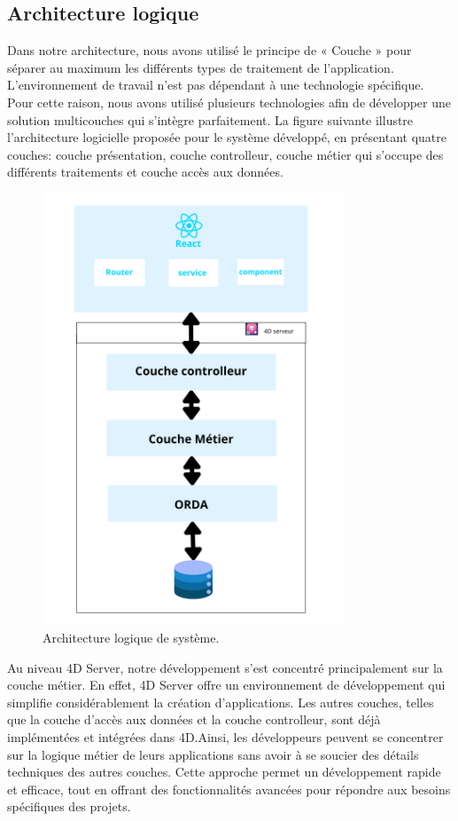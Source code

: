 \subsection{Architecture logique}

Dans notre architecture, nous avons utilisé le principe
de « Couche » pour séparer au maximum les différents types de traitement de l’application. L’environnement de travail n’est pas dépendant à une technologie spécifique.
Pour cette raison, nous avons utilisé plusieurs technologies afin de développer une solution multicouches  qui s’intègre parfaitement. La figure suivante
illustre l’architecture logicielle proposée pour le système développé, en présentant quatre
couches: couche présentation, couche controlleur, couche métier qui s’occupe des différents traitements
et couche accès aux données.


\begin{figure}[H]
    \centering
    \includegraphics[width=9cm]{Figures/architectureLogique.png}
    \caption{Architecture logique de système.}
\end{figure}

Au niveau 4D Server, notre développement s’est concentré principalement sur la couche
métier. En effet, 4D Server offre un environnement de développement qui simplifie considérablement la création d’applications. Les autres couches, telles que la couche d’accès
aux données et la couche controlleur, sont déjà implémentées et intégrées dans 4D.Ainsi, les développeurs peuvent se concentrer sur la logique métier de leurs applications
sans avoir à se soucier des détails techniques des autres couches. Cette approche permet
un développement rapide et efficace, tout en offrant des fonctionnalités avancées pour
répondre aux besoins spécifiques des projets.

